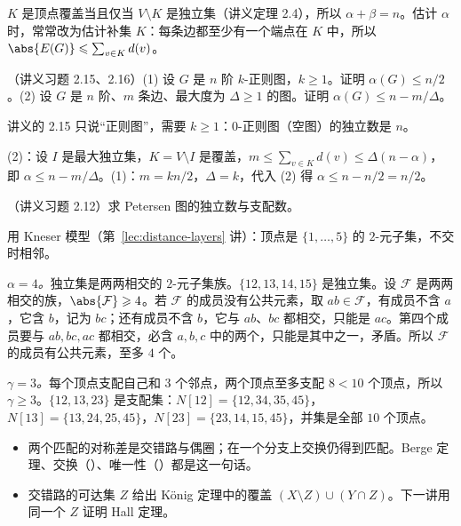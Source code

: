 
$K$ 是顶点覆盖当且仅当 $V\setminus K$ 是独立集（讲义定理 2.4），所以 $\alpha+\beta=n$。估计 $\alpha$ 时，常常改为估计补集 $K$：每条边都至少有一个端点在 $K$ 中，所以 $\abs{E(G)}\leqslant\sum_{v\in K}d(v)$。

\begin{workedexample}\label{we:augmenting-paths:alpha}
（讲义习题 2.15、2.16）(1) 设 $G$ 是 $n$ 阶 $k$-正则图，$k\geqslant1$。证明 $\alpha(G)\leqslant n/2$。(2) 设 $G$ 是 $n$ 阶、$m$ 条边、最大度为 $\Delta\geqslant1$ 的图。证明 $\alpha(G)\leqslant n-m/\Delta$。
\end{workedexample}
\begin{remark}
讲义的 2.15 只说“正则图”，需要 $k\geqslant1$：$0$-正则图（空图）的独立数是 $n$。
\end{remark}
\begin{solution}
(2)：设 $I$ 是最大独立集，$K=V\setminus I$ 是覆盖，$m\leqslant\sum_{v\in K}d(v)\leqslant\Delta(n-\alpha)$，即 $\alpha\leqslant n-m/\Delta$。(1)：$m=kn/2$，$\Delta=k$，代入 (2) 得 $\alpha\leqslant n-n/2=n/2$。
\end{solution}

\begin{workedexample}\label{we:augmenting-paths:petersen}
（讲义习题 2.12）求 Petersen 图的独立数与支配数。
\end{workedexample}
\begin{solution}
用 Kneser 模型（第~\ref{lec:distance-layers} 讲）：顶点是 $\{1,\dots,5\}$ 的 $2$-元子集，不交时相邻。

\emph{$\alpha=4$。}独立集是两两相交的 $2$-元子集族。$\{12,13,14,15\}$ 是独立集。设 $\mathcal F$ 是两两相交的族，$\abs{\mathcal F}\geqslant4$。若 $\mathcal F$ 的成员没有公共元素，取 $ab\in\mathcal F$，有成员不含 $a$，它含 $b$，记为 $bc$；还有成员不含 $b$，它与 $ab$、$bc$ 都相交，只能是 $ac$。第四个成员要与 $ab,bc,ac$ 都相交，必含 $a,b,c$ 中的两个，只能是其中之一，矛盾。所以 $\mathcal F$ 的成员有公共元素，至多 $4$ 个。

\emph{$\gamma=3$。}每个顶点支配自己和 $3$ 个邻点，两个顶点至多支配 $8<10$ 个顶点，所以 $\gamma\geqslant3$。$\{12,13,23\}$ 是支配集：$N[12]=\{12,34,35,45\}$，$N[13]=\{13,24,25,45\}$，$N[23]=\{23,14,15,45\}$，并集是全部 $10$ 个顶点。
\end{solution}


\begin{itemize}
\item 两个匹配的对称差是交错路与偶圈；在一个分支上交换仍得到匹配。Berge 定理、交换（）、唯一性（）都是这一句话。
\item 交错路的可达集 $Z$ 给出 König 定理中的覆盖 $(X\setminus Z)\cup(Y\cap Z)$。下一讲用同一个 $Z$ 证明 Hall 定理。
\end{itemize}

